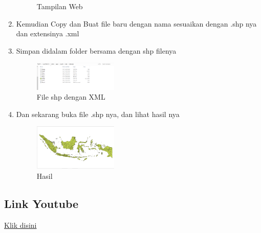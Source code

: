 \begin{enumerate}
\begin{figure}[H]
		\caption{Tampilan Web}
    \end{figure}
  \item Kemudian Copy dan Buat file baru dengan nama sesuaikan dengan .shp nya dan extensinya .xml
  \item Simpan didalam folder bersama dengan shp filenya
  \hfill\break
  \begin{figure}[H]
  \includegraphics[width=4cm]{figures/1174095/4/xml.png}
  \centering
  \caption{File shp dengan XML}
  \end{figure}
  \item Dan sekarang buka file .shp nya, dan lihat hasil nya
  \hfill\break
  \begin{figure}[H]
  \includegraphics[width=4cm]{figures/1174095/4/map.png}
  \centering
  \caption{Hasil}
  \end{figure}
\end{enumerate}
\subsection{Link Youtube}
\href{https://youtu.be/c1XnYYFvGLU}{Klik disini}